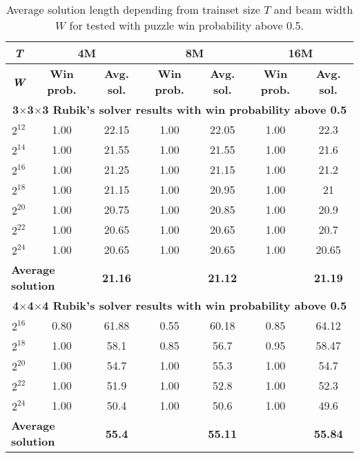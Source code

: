 
\begin{table*}

\caption{Average solution length depending from trainset size $T$ and beam width $W$ for tested with puzzle win probability above 0.5.}\label{tbl_beam_vs_train}

\begin{tabular*}{\textwidth}{@{\extracolsep\fill}c|cc|cc|cc}
\toprule%
\textbf{\textit{T}} & \multicolumn{2}{c|}{\textbf{4M}} & \multicolumn{2}{c|}{\textbf{8M}} & \multicolumn{2}{c}{\textbf{16M}}\\
\midrule
\textbf{\textit{W}} & \textbf{Win prob.} & \textbf{Avg. sol.} & \textbf{Win prob.} & \textbf{Avg. sol.} & \textbf{Win prob.} & \textbf{Avg. sol.} \\
\midrule
\multicolumn{7}{c}{ \textbf{3$\times$3$\times$3 Rubik's solver results with win probability above 0.5}}\\
\midrule
$2^{12}$ & 1.00 & 22.15 & 1.00 & 22.05 & 1.00 & 22.3\\
$2^{14}$ & 1.00 & 21.55 & 1.00 & 21.55 & 1.00 & 21.6\\
$2^{16}$ & 1.00 & 21.25 & 1.00 & 21.15 & 1.00 & 21.2\\
$2^{18}$ & 1.00 & 21.15 & 1.00 & 20.95 & 1.00 & 21\\
$2^{20}$ & 1.00 & 20.75 & 1.00 & 20.85 & 1.00 & 20.9\\
$2^{22}$ & 1.00 & 20.65 & 1.00 & 20.65 & 1.00 & 20.7\\
$2^{24}$ & 1.00 & 20.65 & 1.00 & 20.65 & 1.00 & 20.65\\
\midrule
\multicolumn{2}{l}{\textbf{Average solution}} & \textbf{21.16} & & \textbf{21.12} & & \textbf{21.19}\\ 
\midrule
\multicolumn{7}{c}{ \textbf{4$\times$4$\times$4 Rubik's solver results with win probability above 0.5}}\\
\midrule
$2^{16}$ & 0.80 & 61.88 & 0.55 & 60.18 & 0.85 & 64.12\\
$2^{18}$ & 1.00 & 58.1 & 0.85 & 56.7 & 0.95 & 58.47\\
$2^{20}$ & 1.00 & 54.7 & 1.00 & 55.3 & 1.00 & 54.7\\
$2^{22}$ & 1.00 & 51.9 & 1.00 & 52.8 & 1.00 & 52.3\\
$2^{24}$ & 1.00 & 50.4 & 1.00 & 50.6 & 1.00 & 49.6\\
\midrule
\multicolumn{2}{l}{\textbf{Average solution}} & \textbf{55.4} & & \textbf{55.11} & & \textbf{55.84}\\ 
\midrule
\end{tabular*}

\end{table*}